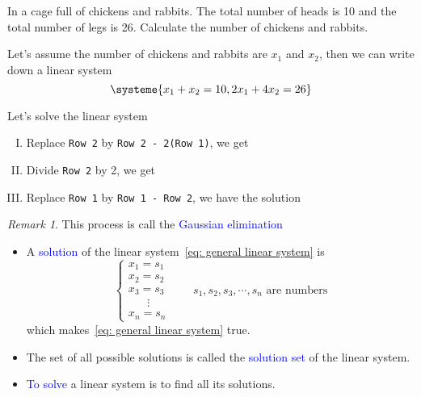\documentclass{beamer}
\theoremstyle{definition}
\theoremstyle{remark}
\newtheorem*{remark}{Remark}
\begin{document}
\begin{frame}[t]
\begin{example}\label{13:09-05/31/2022}
In a cage full of chickens and rabbits. The total number of heads is 10 and the total number of legs is 26. Calculate the number of chickens and rabbits.
\end{example}\pause
\begin{solution}
Let's assume the number of chickens and rabbits are $x_1$ and $x_2$, then we can write down a linear system
\begin{equation}\label{14:34-05/31/2022}
\systeme{x_1+x_2=10,2x_1+4x_2=26}
\end{equation}
\end{solution}
\end{frame}

\begin{frame}[t]
\begin{solution}
Let's solve the linear system \pause
\begin{enumerate}[I.]
\item Replace \texttt{Row 2} by \texttt{Row 2 - 2(Row 1)}, we get 
\pause
\item Divide \texttt{Row 2} by 2, we get 
\pause
\item Replace \texttt{Row 1} by \texttt{Row 1 - Row 2}, we have the solution \\
\end{enumerate}
\end{solution}\pause

\begin{remark}
This process is call the \textcolor{blue}{Gaussian elimination}
\end{remark}
\end{frame}

\begin{frame}[t]
\begin{definition}
\begin{itemize}
\item A \textcolor{blue}{solution} of the linear system~\eqref{eq: general linear system} is
\[
\begin{cases}
x_1=s_1\\
x_2=s_2\\
x_3=s_3\\
\quad\,\,\,\,\vdots\\
x_n=s_n
\end{cases}\qquad\text{$s_1,s_2,s_3,\cdots,s_n$ are numbers}
\]
which makes~\eqref{eq: general linear system} true. \pause
\item The set of all possible solutions is called the \textcolor{blue}{solution set} of the linear system.
\pause
\item \textcolor{blue}{To solve} a linear system is to find all its solutions.
\end{itemize}
\end{definition}
\end{frame}
\end{document}
